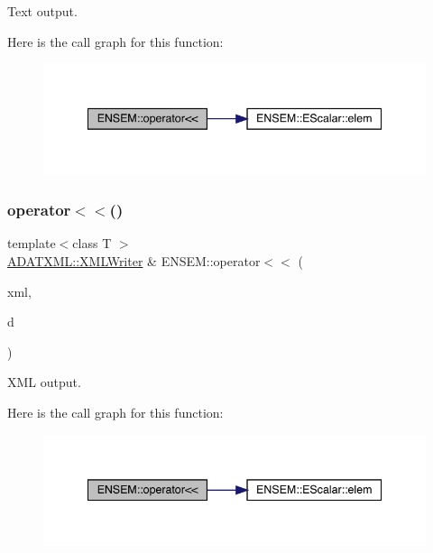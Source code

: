Text output. 

Here is the call graph for this function\+:
\nopagebreak
\begin{figure}[H]
\begin{center}
\leavevmode
\includegraphics[width=341pt]{d4/dca/group__escalar_ga4fa895e4a145c879739c3f8497717e98_cgraph}
\end{center}
\end{figure}
\mbox{\label{group__escalar_gae78b4ef06a7e72aa75cae11dd9c48327}} 
\subsubsection{\texorpdfstring{operator$<$$<$()}{operator<<()}\hspace{0.1cm}{\footnotesize\ttfamily [3/4]}}
{\footnotesize\ttfamily template$<$class T $>$ \\
\mbox{\hyperlink{classADATXML_1_1XMLWriter}{A\+D\+A\+T\+X\+M\+L\+::\+X\+M\+L\+Writer}} \& E\+N\+S\+E\+M\+::operator$<$$<$ (\begin{DoxyParamCaption}\item[{\mbox{\hyperlink{classADATXML_1_1XMLWriter}{A\+D\+A\+T\+X\+M\+L\+::\+X\+M\+L\+Writer}} \&}]{xml,  }\item[{const \mbox{\hyperlink{classENSEM_1_1EScalar}{E\+Scalar}}$<$ T $>$ \&}]{d }\end{DoxyParamCaption})\hspace{0.3cm}{\ttfamily [inline]}}



X\+ML output. 

Here is the call graph for this function\+:
\nopagebreak
\begin{figure}[H]
\begin{center}
\leavevmode
\includegraphics[width=341pt]{d4/dca/group__escalar_gae78b4ef06a7e72aa75cae11dd9c48327_cgraph}
\end{center}
\end{figure}
\mbox{\label{group__escalar_ga70b4aa1415cb636de9b4b0d56d26486b}} 
